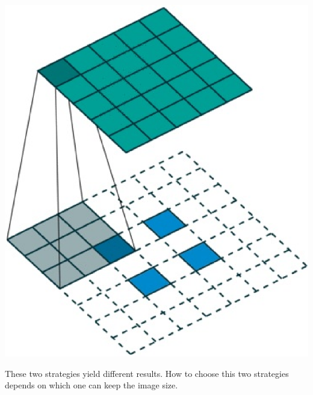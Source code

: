 \documentclass{article}
\begin{document}
\begin{enumerate}
\begin{center}
\includegraphics[scale=0.5]{ipad}
\end{center}
\end{enumerate}

These two strategies yield different results. How to choose this two strategies depends on which one can keep the image size.
\end{document}
